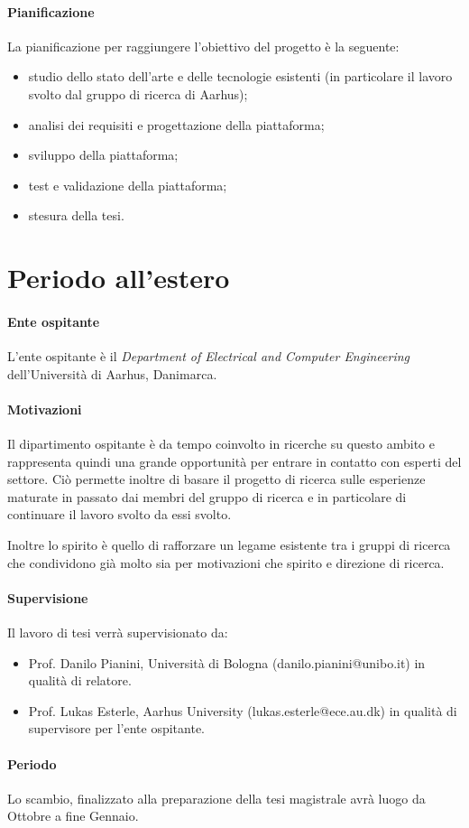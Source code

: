 \documentclass[12pt, a4paper]{article}
\begin{document}
\paragraph{Pianificazione}

La pianificazione per raggiungere l'obiettivo del progetto è la seguente:
\begin{itemize}
    \item studio dello stato dell'arte e delle tecnologie esistenti (in particolare il lavoro svolto dal gruppo di ricerca 
    di Aarhus);
    \item analisi dei requisiti e progettazione della piattaforma;
    \item sviluppo della piattaforma;
    \item test e validazione della piattaforma;
    \item stesura della tesi.
\end{itemize}

\section{Periodo all'estero}

\paragraph{Ente ospitante}
L'ente ospitante è il \textit{Department of Electrical and Computer Engineering} dell'Università di Aarhus, Danimarca.

\paragraph{Motivazioni}
Il dipartimento ospitante è da tempo coinvolto in ricerche su questo ambito e rappresenta
quindi una grande opportunità per entrare in contatto con esperti del settore.
Ciò permette inoltre di basare il progetto di ricerca sulle esperienze maturate in passato
dai membri del gruppo di ricerca e in particolare di continuare il lavoro svolto da essi svolto.

Inoltre lo spirito è quello di rafforzare un legame esistente tra i gruppi di ricerca che
condividono già molto sia per motivazioni che spirito e direzione di ricerca.

\paragraph{Supervisione}
Il lavoro di tesi verrà supervisionato da:
\begin{itemize}
    \item Prof. Danilo Pianini, Università di Bologna (danilo.pianini@unibo.it) in qualità di relatore.
    \item Prof. Lukas Esterle, Aarhus University (lukas.esterle@ece.au.dk) in qualità di supervisore per l'ente ospitante.
\end{itemize}

\paragraph{Periodo}
Lo scambio, finalizzato alla preparazione della tesi magistrale avrà luogo da Ottobre a fine Gennaio.
\end{document}
